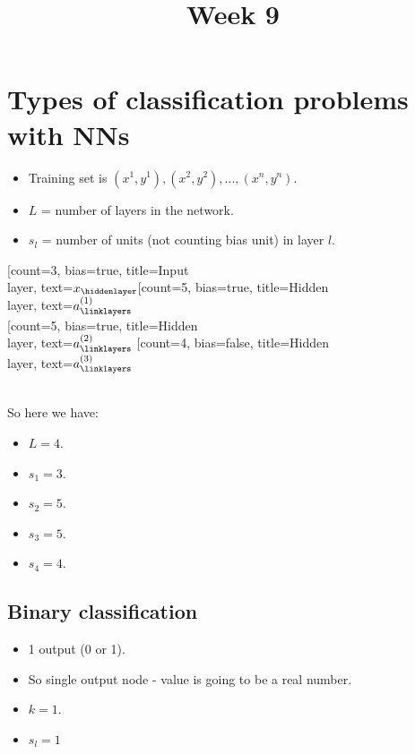 \documentclass{article}
\title{Week 9}
\begin{document}
\maketitle
\newpage
{}

\section*{Types of classification problems with NNs}
\begin{itemize}
  \item Training set is ${(x^1, y^1), (x^2, y^2), ..., (x^n, y^n)}$.
  \item $L$ = number of layers in the network.
  \item $s_l$ = number of units (not counting bias unit) in layer $l$.
\end{itemize}

\begin{neuralnetwork}[height=6]
  \newcommand{\x}[2]{$x_#2$}
  \newcommand{\hfirst}[2]{\small $a^{(1)}_#2$}
  \newcommand{\hsecond}[2]{\small $a^{(2)}_#2$}
  \newcommand{\hthird}[2]{\small $a^{(3)}_#2$}
  [count=3, bias=true, title=Input\\layer, text=\x]
  \hiddenlayer[count=5, bias=true, title=Hidden\\layer, text=\hfirst] \linklayers\\
  \hiddenlayer[count=5, bias=true, title=Hidden\\layer, text=\hsecond] \linklayers
  \hiddenlayer[count=4, bias=false, title=Hidden\\layer, text=\hthird] \linklayers
\end{neuralnetwork}

~\\
So here we have:
\begin{itemize}
  \item $L=4$.
  \item $s_1 = 3$.
  \item $s_2 = 5$.
  \item $s_3 = 5$.
  \item $s_4 = 4$.
\end{itemize}

\subsection*{Binary classification}
\begin{itemize}
  \item 1 output (0 or 1).
  \item So single output node - value is going to be a real number.
  \item $k = 1$.
  \item $s_l = 1$
\end{itemize}
\end{document}
